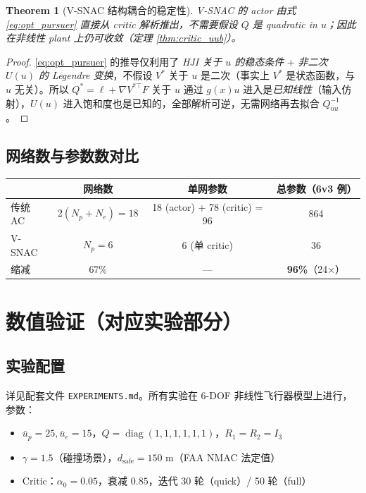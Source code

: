 \documentclass[11pt,a4paper]{article}
\DeclareMathOperator{\diag}{diag}
\newcommand{\ubar}{\bar{u}}
\newtheorem{theorem}{Theorem}
\theoremstyle{remark}
\begin{document}
\begin{theorem}[V-SNAC 结构耦合的稳定性]\label{thm:vsnac_advantage}
V-SNAC 的 actor 由式 \eqref{eq:opt_pursuer} 直接从 critic 解析推出，不需要假设 $Q$ 是 quadratic in $u$；因此在非线性 plant 上仍可收敛（定理 \ref{thm:critic_uub}）。
\end{theorem}

\begin{proof}
\eqref{eq:opt_pursuer} 的推导仅利用了 \emph{HJI 关于 $u$ 的稳态条件} + \emph{非二次 $U(u)$ 的 Legendre 变换}，不假设 $V^*$ 关于 $u$ 是二次（事实上 $V^*$ 是状态函数，与 $u$ 无关）。所以 $Q^*=\ell+\nabla V^{*\top}F$ 关于 $u$ 通过 $g(x)u$ 进入是\emph{已知线性}（输入仿射），$U(u)$ 进入饱和度也是已知的，全部解析可逆，无需网络再去拟合 $Q_{uu}^{-1}$。
\end{proof}

\subsection{网络数与参数数对比}

\begin{tabular}{l|c|c|c}
\hline
& 网络数 & 单网参数 & 总参数（6v3 例）\\
\hline
传统 AC & $2(N_p+N_e)=18$ & 18 (actor) + 78 (critic) = 96 & 864 \\
V-SNAC & $N_p=6$ & 6 (单 critic) & 36 \\
缩减 & 67\% & — & \textbf{96\%}（24×）\\
\hline
\end{tabular}

\section{数值验证（对应实验部分）}

\subsection{实验配置}

详见配套文件 \texttt{EXPERIMENTS.md}。所有实验在 6-DOF 非线性飞行器模型上进行，参数：
\begin{itemize}
\item $\ubar_p=25,\ubar_e=15$，$Q=\diag(1,1,1,1,1,1)$，$R_1=R_2=I_3$
\item $\gamma=1.5$（碰撞场景），$d_{\text{safe}}=150$ m（FAA NMAC 法定值）
\item Critic：$\alpha_0=0.05$，衰减 $0.85$，迭代 30 轮（quick）/ 50 轮（full）
\end{itemize}
\end{document}
